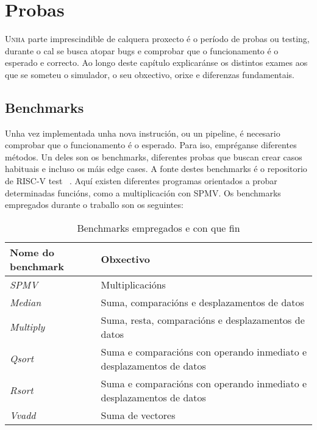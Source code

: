 \chapter{Probas}
\label{chap:probas}

\lettrine{U}{nha} parte imprescindible de calquera proxecto é o período de probas ou testing, durante o cal se busca atopar bugs e comprobar que o funcionamento é o esperado e correcto. Ao longo deste capítulo explicaránse os distintos exames aos que se someteu o simulador, o seu obxectivo, orixe e diferenzas fundamentais.

\section{Benchmarks}\label{sec:benchmarks}
Unha vez implementada unha nova instrución, ou un pipeline, é necesario comprobar que o funcionamento é o esperado. Para iso, empréganse diferentes métodos. Un deles son os benchmarks, diferentes probas que buscan crear casos habituais e incluso os máis edge cases. A fonte destes benchmarks  é o repositorio de RISC-V test ~\cite{riscv_tests}. Aquí existen diferentes programas orientados a probar determinadas funcións, como a multiplicación con SPMV. Os benchmarks empregados durante o traballo son os seguintes:
\begin{table}[hp!]
  \centering
  \begin{tabular}{|p{5cm}|p{8cm}|}
    \rowcolor{udcpink!25}
    \textbf{Nome do benchmark} & \textbf{Obxectivo} \\\hline
    \textit{SPMV} & Multiplicacións \\
    \textit{Median} & Suma, comparacións e desplazamentos de datos \\
    \textit{Multiply} & Suma, resta, comparacións e desplazamentos de datos \\
    \textit{Qsort} & Suma e comparacións con operando inmediato e desplazamentos de datos \\
    \textit{Rsort} & Suma e comparacións con operando inmediato e desplazamentos de datos \\
    \textit{Vvadd} & Suma de vectores\\
  \end{tabular}
  \caption{Benchmarks empregados e con que fin}
  \label{tab:benchmarks}
\end{table}

